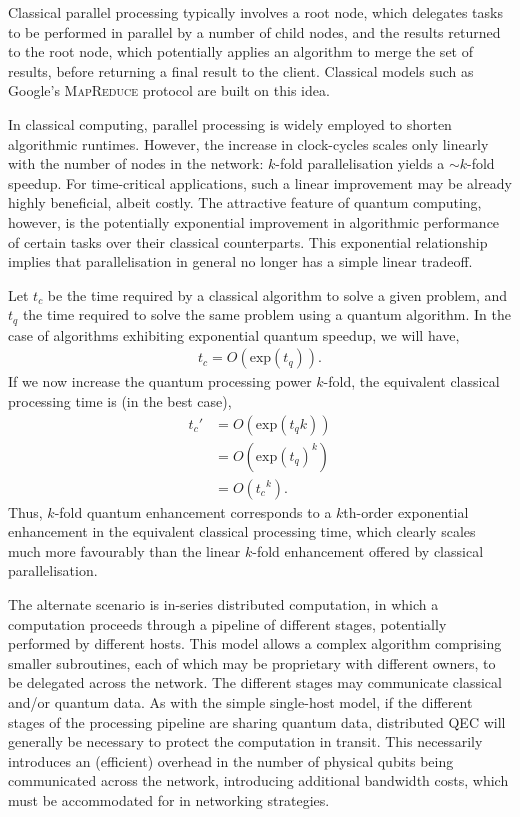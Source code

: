 \documentclass[aps, rmp, twocolumn, amsmath, amssymb, nofootinbib, superscriptaddress, longbibliography, floatfix, table-of-contents, eqsecnum]{revtex4-1}
\begin{document}
Classical parallel processing typically involves a root node, which delegates tasks to be performed in parallel by a number of child nodes, and the results returned to the root node, which potentially applies an algorithm to merge the set of results, before returning a final result to the client. Classical models such as Google's \textsc{MapReduce} protocol \cite{bib:MapReduce} are built on this idea.

In classical computing, parallel processing is widely employed to shorten algorithmic runtimes. However, the increase in clock-cycles scales only linearly with the number of nodes in the network: $k$-fold parallelisation yields a \mbox{$\sim k$}-fold speedup. For time-critical applications, such a linear improvement may be already highly beneficial, albeit costly. The attractive feature of quantum computing, however, is the potentially exponential improvement in algorithmic performance of certain tasks over their classical counterparts. This exponential relationship implies that parallelisation in general no longer has a simple linear tradeoff.

Let $t_c$ be the time required by a classical algorithm to solve a given problem, and $t_q$ the time required to solve the same problem using a quantum algorithm. In the case of algorithms exhibiting exponential quantum speedup, we will have,
\begin{align}
t_c = O(\text{exp}(t_q)).
\end{align}
If we now increase the quantum processing power $k$-fold, the equivalent classical processing time is (in the best case),
\begin{align}
t_c' &= O(\text{exp}(t_q k)) \nonumber \\
&= O(\text{exp}(t_q)^{k}) \nonumber \\
&= O({t_c}^{k}).
\end{align}
Thus, $k$-fold quantum enhancement corresponds to a $k$th-order exponential enhancement in the equivalent classical processing time, which clearly scales much more favourably than the linear $k$-fold enhancement offered by classical parallelisation.

The alternate scenario is in-series distributed computation, in which a computation proceeds through a pipeline of different stages, potentially performed by different hosts. This model allows a complex algorithm comprising smaller subroutines, each of which may be proprietary with different owners, to be delegated across the network. The different stages may communicate classical and/or quantum data. As with the simple single-host model, if the different stages of the processing pipeline are sharing quantum data, distributed QEC will generally be necessary to protect the computation in transit. This necessarily introduces an (efficient) overhead in the number of physical qubits being communicated across the network, introducing additional bandwidth costs, which must be accommodated for in networking strategies.
\end{document}
